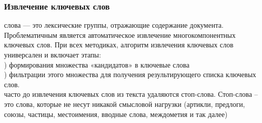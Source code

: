 \documentclass{article}
\newcommand\tab[1][1cm]{\hspace*{#1}}
\begin{document}
\subsubsection{Извлечение ключевых слов}
 слова — это лексические группы, отражающие содержание документа. Проблематичным является автоматическое извлечение многокомпонентных ключевых слов. При всех методиках, алгоритм извлечения ключевых слов универсален и включает этапы:\\
) формирования множества «кандидатов» в ключевые слова\\
) фильтрации этого множества для получения результирующего списка ключевых слов.\\
 часто до извлечения ключевых слов из текста удаляются стоп-слова. Стоп-слова – это слова, которые не несут никакой смысловой нагрузки (артикли, предлоги, союзы, частицы, местоимения, вводные слова, междометия и так далее)
\end{document}
